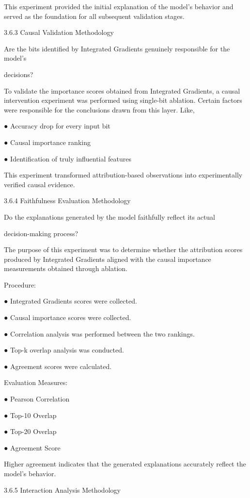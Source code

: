 This experiment provided the initial explanation of the model's behavior and served as the 
foundation for all subsequent validation stages. 

3.6.3 Causal Validation Methodology 

Are the bits identified by Integrated Gradients genuinely responsible for the model's 

decisions? 

To validate the importance scores obtained from Integrated Gradients, a causal intervention 
experiment was performed using single-bit ablation. Certain factors were responsible for the 
conclusions drawn from this layer. Like, 

●  Accuracy drop for every input bit 

●  Causal importance ranking 

●  Identification of truly influential features 

This experiment transformed attribution-based observations into experimentally verified causal 
evidence. 

3.6.4 Faithfulness Evaluation Methodology 

Do the explanations generated by the model faithfully reflect its actual 

decision-making process? 

The purpose of this experiment was to determine whether the attribution scores produced by 
Integrated Gradients aligned with the causal importance measurements obtained through 
ablation. 

Procedure: 

●  Integrated Gradients scores were collected. 

●  Causal importance scores were collected. 

●  Correlation analysis was performed between the two rankings. 


●  Top-k overlap analysis was conducted. 

●  Agreement scores were calculated. 

Evaluation Measures: 

●  Pearson Correlation 

●  Top-10 Overlap 

●  Top-20 Overlap 

●  Agreement Score 

Higher agreement indicates that the generated explanations accurately reflect the model's 
behavior. 

3.6.5 Interaction Analysis Methodology 

